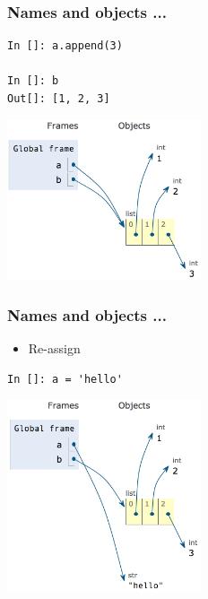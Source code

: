 \documentclass[14pt,compress]{beamer}
\begin{document}
\begin{frame}[fragile]
  \frametitle{Names and objects ...}
  \begin{minipage}{0.4\textwidth}
  \begin{lstlisting}
In []: a.append(3)

In []: b
Out[]: [1, 2, 3]
  \end{lstlisting}
\end{minipage}
  \begin{minipage}{0.4\textwidth}
    \hspace*{0.4in}\includegraphics[width=2.25in]{data/a_b_list1.png}
  \end{minipage}

\end{frame}

\begin{frame}[fragile]
  \frametitle{Names and objects ...}
  \begin{minipage}{0.4\textwidth}
  \begin{itemize}
  \item Re-assign 
  \end{itemize}
  \begin{lstlisting}
In []: a = 'hello'
\end{lstlisting}
\pause
\end{minipage}
  \begin{minipage}{0.4\textwidth}
    \hspace*{0.4in}\includegraphics[width=2.25in]{data/a_str_b_list.png}
  \end{minipage}
\end{frame}
\end{document}
